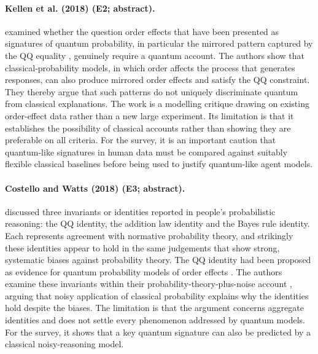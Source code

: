 \documentclass[10pt,a4paper]{article}
\begin{document}
\paragraph{Kellen et al. (2018) (E2; abstract).} \citet{Kellen2018} examined whether the question order effects that have been presented as signatures of quantum probability, in particular the mirrored pattern captured by the QQ equality \citep{Wang2014}, genuinely require a quantum account. The authors show that classical-probability models, in which order affects the process that generates responses, can also produce mirrored order effects and satisfy the QQ constraint. They thereby argue that such patterns do not uniquely discriminate quantum from classical explanations. The work is a modelling critique drawing on existing order-effect data rather than a new large experiment. Its limitation is that it establishes the possibility of classical accounts rather than showing they are preferable on all criteria. For the survey, it is an important caution that quantum-like signatures in human data must be compared against suitably flexible classical baselines before being used to justify quantum-like agent models.

\paragraph{Costello and Watts (2018) (E3; abstract).} \citet{Costello2018} discussed three invariants or identities reported in people's probabilistic reasoning: the QQ identity, the addition law identity and the Bayes rule identity. Each represents agreement with normative probability theory, and strikingly these identities appear to hold in the same judgements that show strong, systematic biases against probability theory. The QQ identity had been proposed as evidence for quantum probability models of order effects \citep{Wang2014}. The authors examine these invariants within their probability-theory-plus-noise account \citep{Costello2014}, arguing that noisy application of classical probability explains why the identities hold despite the biases. The limitation is that the argument concerns aggregate identities and does not settle every phenomenon addressed by quantum models. For the survey, it shows that a key quantum signature can also be predicted by a classical noisy-reasoning model.
\end{document}

